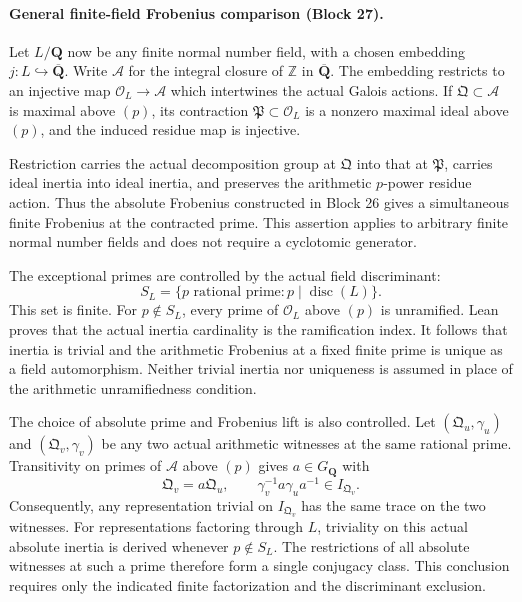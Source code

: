 \documentclass[11pt]{article}
\theoremstyle{definition}
\theoremstyle{remark}
\newcommand{\Q}{\mathbf Q}
\begin{document}
\paragraph{General finite-field Frobenius comparison (Block 27).}
Let $L/\Q$ now be any finite normal number field, with a chosen embedding
$j:L\hookrightarrow\overline{\Q}$. Write $\mathcal A$ for the integral
closure of $\mathbb Z$ in $\overline{\Q}$. The embedding restricts to an
injective map $\mathcal O_L\to\mathcal A$ which intertwines the actual
Galois actions. If $\mathfrak Q\subset\mathcal A$ is maximal above $(p)$,
its contraction $\mathfrak P\subset\mathcal O_L$ is a nonzero maximal
ideal above $(p)$, and the induced residue map is injective.

Restriction carries the actual decomposition group at $\mathfrak Q$ into
that at $\mathfrak P$, carries ideal inertia into ideal inertia, and
preserves the arithmetic $p$-power residue action. Thus the absolute
Frobenius constructed in Block 26 gives a simultaneous finite Frobenius
at the contracted prime. This assertion applies to arbitrary finite normal
number fields and does not require a cyclotomic generator.

The exceptional primes are controlled by the actual field discriminant:
\[
 S_L=\{p\text{ rational prime}:p\mid\operatorname{disc}(L)\}.
\]
This set is finite. For $p\notin S_L$, every prime of $\mathcal O_L$
above $(p)$ is unramified. Lean proves that the actual inertia cardinality
is the ramification index. It follows that inertia is trivial and the
arithmetic Frobenius at a fixed finite prime is unique as a field
automorphism. Neither trivial inertia nor uniqueness is assumed in place
of the arithmetic unramifiedness condition.

The choice of absolute prime and Frobenius lift is also controlled. Let
$(\mathfrak Q_u,\gamma_u)$ and $(\mathfrak Q_v,\gamma_v)$ be any two
actual arithmetic witnesses at the same rational prime. Transitivity on
primes of $\mathcal A$ above $(p)$ gives $a\in G_{\Q}$ with
\[
 \mathfrak Q_v=a\mathfrak Q_u,\qquad
 \gamma_v^{-1}a\gamma_u a^{-1}\in I_{\mathfrak Q_v}.
\]
Consequently, any representation trivial on $I_{\mathfrak Q_v}$ has the
same trace on the two witnesses. For representations factoring through
$L$, triviality on this actual absolute inertia is derived whenever
$p\notin S_L$. The restrictions of all absolute witnesses at such a prime
therefore form a single conjugacy class. This conclusion requires only
the indicated finite factorization and the discriminant exclusion.
\end{document}
